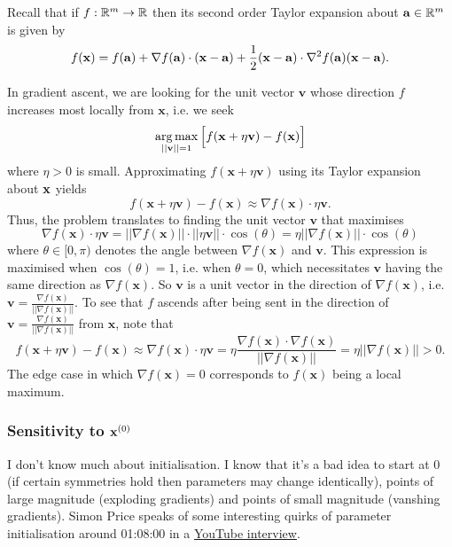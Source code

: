 \documentclass[11pt]{article}
\begin{document}
\begin{tcolorbox}[title={\centering\textbf{Multivariate Taylor expansion}}, colback=myLightBlue, colbacktitle=myDarkBlue, colframe=myDarkBlue, coltitle=white]
    Recall that if $f:\mathbb{R}^m\to\mathbb{R}$ then its second order Taylor expansion about $\mathbf{a}\in\mathbb{R}^m$ is given by
    $$
    f(\mathbf{x})
    =
    f(\mathbf{a})+\nabla f(\mathbf{a})\cdot(\mathbf{x}-\mathbf{a})+\frac{1}{2}(\mathbf{x}-\mathbf{a})\cdot\nabla^2 f(\mathbf{a})(\mathbf{x}-\mathbf{a}).
    $$
\end{tcolorbox}

In gradient ascent, we are looking for the unit vector $\mathbf{v}$ whose direction $f$ increases most locally from $\mathbf{x}$, i.e. we seek
$$\operatorname*{arg\,max}_{||\mathbf{v}||=1}\Big[f(\mathbf{x}+\eta\mathbf{v})-f(\mathbf{x})\Big]$$
where $\eta>0$ is small. Approximating $f(\mathbf{x}+\eta\mathbf{v})$ using its Taylor expansion about $\mathbf{x}$ yields
$$
f(\mathbf{x}+\eta\mathbf{v})-f(\mathbf{x})
\approx
\nabla f(\mathbf{x})\cdot\eta\mathbf{v}.
$$
Thus, the problem translates to finding the unit vector $\mathbf{v}$ that maximises
$$
\nabla f(\mathbf{x})\cdot\eta\mathbf{v}=||\nabla f(\mathbf{x})||\cdot||\eta\mathbf{v}||\cdot\cos(\theta)=\eta||\nabla f(\mathbf{x})||\cdot\cos(\theta)
$$
where $\theta\in[0,\pi)$ denotes the angle between $\nabla f(\mathbf{x})$ and $\mathbf{v}$. This expression is maximised when $\cos(\theta)=1$, i.e. when $\theta=0$, which necessitates $\mathbf{v}$ having the same direction as $\nabla f(\mathbf{x})$. So $\mathbf{v}$ is a unit vector in the direction of $\nabla f(\mathbf{x})$, i.e. $\mathbf{v}=\frac{\nabla f(\mathbf{x})}{||\nabla f(\mathbf{x})||}$. To see that $f$ ascends after being sent in the direction of $\mathbf{v}=\frac{\nabla f(\mathbf{x})}{||\nabla f(\mathbf{x})||}$ from $\mathbf{x}$, note that
$$
f(\mathbf{x}+\eta\mathbf{v})-f(\mathbf{x})
\approx
\nabla f(\mathbf{x})\cdot\eta\mathbf{v}
=
\eta\frac{\nabla f(\mathbf{x})\cdot\nabla f(\mathbf{x})}{||\nabla f(\mathbf{x})||}
=
\eta||\nabla f(\mathbf{x})||
>
0.
$$
The edge case in which $\nabla f(\mathbf{x})=0$ corresponds to $f(\mathbf{x})$ being a local maximum.

\subsubsection{Sensitivity to $\mathbf{x}^{(0)}$}
I don't know much about initialisation. I know that it's a bad idea to start at 0 (if certain symmetries hold then parameters may change identically), points of large magnitude (exploding gradients) and points of small magnitude (vanshing gradients). Simon Price speaks of some interesting quirks of parameter initialisation around 01:08:00 in a \href{https://www.youtube.com/watch?v=sJXn4Cl4oww&list=PLwFLAA-F1PgpU9lgxOdhjILkMXUagGnea&ab_channel=MachineLearningStreetTalk}{YouTube interview}.
\end{document}
